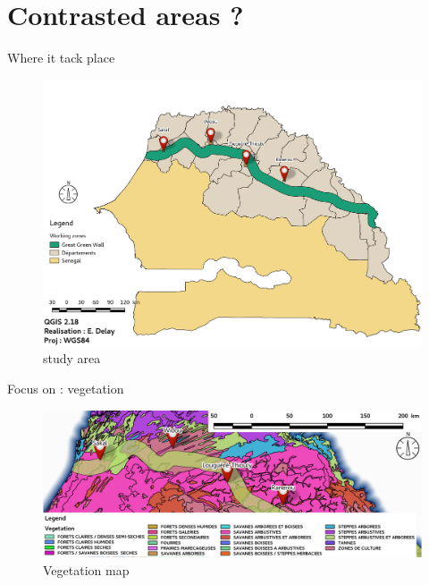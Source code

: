 \documentclass[newPxFont]{beamer}
\begin{document}
\section{Contrasted areas ?}
\begin{frame}[c]{Where it tack place}
\vspace{-1cm}
\begin{figure}
	\centering
	\includegraphics[width = \textwidth]{img/localisation_map}
	\caption{study area}
\end{figure}
\end{frame}

\begin{frame}[c]{Focus on : vegetation}
\vspace{-1cm}
\begin{figure}
	\centering
	\includegraphics[width = \textwidth]{img/vegetation_map.png}
	\caption{Vegetation map}
\end{figure}
\end{frame}
\end{document}

